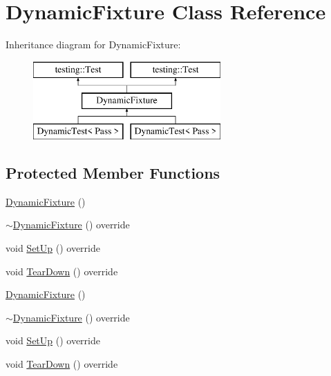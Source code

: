 \hypertarget{class_dynamic_fixture}{}\section{Dynamic\+Fixture Class Reference}
\label{class_dynamic_fixture}
Inheritance diagram for Dynamic\+Fixture\+:\begin{figure}[H]
\begin{center}
\leavevmode
\includegraphics[height=3.000000cm]{d5/dec/class_dynamic_fixture}
\end{center}
\end{figure}
\subsection*{Protected Member Functions}
\begin{DoxyCompactItemize}
\item 
\mbox{\hyperlink{class_dynamic_fixture_a824c439775903dff798c35dbfab09d99}{Dynamic\+Fixture}} ()
\item 
\mbox{\hyperlink{class_dynamic_fixture_ae9848b5a982ea389bf675356d842533d}{$\sim$\+Dynamic\+Fixture}} () override
\item 
void \mbox{\hyperlink{class_dynamic_fixture_a1439886d8a6972815b60a216d731a115}{Set\+Up}} () override
\item 
void \mbox{\hyperlink{class_dynamic_fixture_a10e8ae5b963b80a99ad8892bc4974aac}{Tear\+Down}} () override
\item 
\mbox{\hyperlink{class_dynamic_fixture_a824c439775903dff798c35dbfab09d99}{Dynamic\+Fixture}} ()
\item 
\mbox{\hyperlink{class_dynamic_fixture_ae9848b5a982ea389bf675356d842533d}{$\sim$\+Dynamic\+Fixture}} () override
\item 
void \mbox{\hyperlink{class_dynamic_fixture_a1439886d8a6972815b60a216d731a115}{Set\+Up}} () override
\item 
void \mbox{\hyperlink{class_dynamic_fixture_a10e8ae5b963b80a99ad8892bc4974aac}{Tear\+Down}} () override
\end{DoxyCompactItemize}
